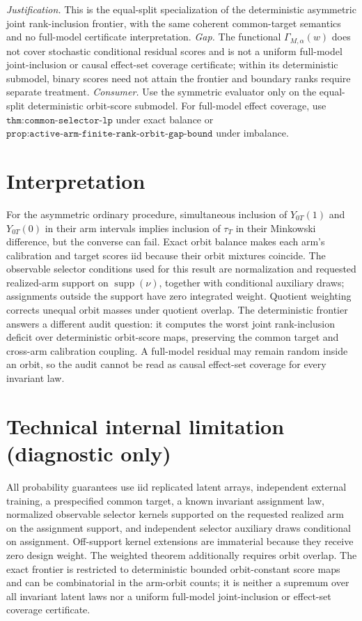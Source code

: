 \documentclass{article}
\begin{document}
\par\smallskip\noindent \textit{Justification.} This is the equal-split specialization of the deterministic asymmetric joint rank-inclusion frontier, with the same coherent common-target semantics and no full-model certificate interpretation. \textit{Gap.} The functional \(\Gamma_{M,\alpha}(w)\) does not cover stochastic conditional residual scores and is not a uniform full-model joint-inclusion or causal effect-set coverage certificate; within its deterministic submodel, binary scores need not attain the frontier and boundary ranks require separate treatment. \textit{Consumer.} Use the symmetric evaluator only on the equal-split deterministic orbit-score submodel. For full-model effect coverage, use \(\texttt{thm:common-selector-lp}\) under exact balance or \(\texttt{prop:active-arm-finite-rank-orbit-gap-bound}\) under imbalance.

\section{Interpretation}

For the asymmetric ordinary procedure, simultaneous inclusion of \(Y_{0T}(1)\) and \(Y_{0T}(0)\) in their arm intervals implies inclusion of \(\tau_T\) in their Minkowski difference, but the converse can fail. Exact orbit balance makes each arm's calibration and target scores iid because their orbit mixtures coincide. The observable selector conditions used for this result are normalization and requested realized-arm support on \(\operatorname{supp}(\nu)\), together with conditional auxiliary draws; assignments outside the support have zero integrated weight. Quotient weighting corrects unequal orbit masses under quotient overlap. The deterministic frontier answers a different audit question: it computes the worst joint rank-inclusion deficit over deterministic orbit-score maps, preserving the common target and cross-arm calibration coupling. A full-model residual may remain random inside an orbit, so the audit cannot be read as causal effect-set coverage for every invariant law.

\section*{Technical internal limitation (diagnostic only)}

All probability guarantees use iid replicated latent arrays, independent external training, a prespecified common target, a known invariant assignment law, normalized observable selector kernels supported on the requested realized arm on the assignment support, and independent selector auxiliary draws conditional on assignment. Off-support kernel extensions are immaterial because they receive zero design weight. The weighted theorem additionally requires orbit overlap. The exact frontier is restricted to deterministic bounded orbit-constant score maps and can be combinatorial in the arm-orbit counts; it is neither a supremum over all invariant latent laws nor a uniform full-model joint-inclusion or effect-set coverage certificate.
\end{document}
